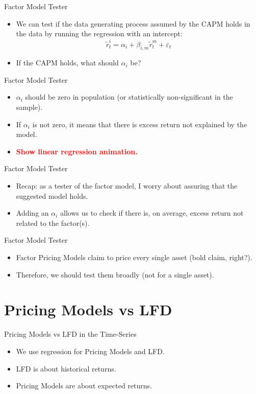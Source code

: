 \documentclass{beamer}
\newcommand{\highlightred}[1]{\textcolor{red}{\textbf{#1}}}
\begin{document}
\begin{frame}{Factor Model Tester}
    \begin{itemize}
    \item We can test if the data generating process assumed by the CAPM holds in the data by running the regression with an intercept:
    $$
    \tilde{r}^i_t = \alpha_{i} + \beta_{i, m} \tilde{r}^m_t + \varepsilon_t
    $$
    \item If the CAPM holds, what should $\alpha_{i}$ be?
    \end{itemize}
\end{frame}

\begin{frame}{Factor Model Tester}
    \begin{itemize}
    \item $\alpha_{i}$ should be zero in population (or statistically non-significant in the sample).
    \item If $\alpha_{i}$ is not zero, it means that there is excess return not explained by the model.
    \item \highlightred{Show linear regression animation.}
    \end{itemize}
\end{frame}

\begin{frame}{Factor Model Tester}
    \begin{itemize}
        \item Recap: as a tester of the factor model, I worry about assuring that the suggested model holds.
        \item Adding an $\alpha_{i}$ allows us to check if there is, on average, excess return not related to the factor(s).
    \end{itemize}
\end{frame}

\begin{frame}{Factor Model Tester}
    \begin{itemize}
        \item Factor Pricing Models claim to price every single asset (bold claim, right?).
        \item Therefore, we should test them broadly (not for a single asset).
    \end{itemize}
\end{frame}

\section{Pricing Models vs LFD}
\begin{frame}{Pricing Models vs LFD in the Time-Series}
    \begin{itemize}
        \item We use regression for Pricing Models and LFD.
        \item LFD is about historical returns.
        \item Pricing Models are about expected returns.
    \end{itemize}
\end{frame}
\end{document}
